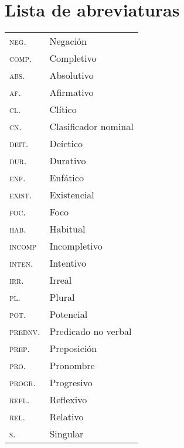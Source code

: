 \section*{Lista de abreviaturas}

\begin{table}[htbp]
      \begin{tabular}{ll}
      \textsc{neg.} & Negación \\
      \textsc{comp.} & Completivo \\
      \textsc{abs.} & Absolutivo \\
      \textsc{af.} & Afirmativo \\
      \textsc{cl.} & Clítico \\
      \textsc{cn.} & Clasificador nominal \\
      \textsc{deit.} & Deíctico \\
      \textsc{dur.} & Durativo \\
      \textsc{enf.} & Enfático \\
      \textsc{exist.} & Existencial \\
      \textsc{foc.} & Foco \\
      \textsc{hab.} & Habitual \\
      \textsc{incomp} & Incompletivo \\
      \textsc{inten.} & Intentivo \\
      \textsc{irr.} & Irreal \\
      \textsc{pl.} & Plural \\
      \textsc{pot.} & Potencial \\
      \textsc{prednv.} & Predicado no verbal \\
      \textsc{prep.} & Preposición \\
      \textsc{pro.} & Pronombre \\
      \textsc{progr.} & Progresivo \\
      \textsc{refl.} & Reflexivo \\
      \textsc{rel.} & Relativo \\
      \textsc{s.} & Singular \\
      \end{tabular}%
  \end{table}%
  